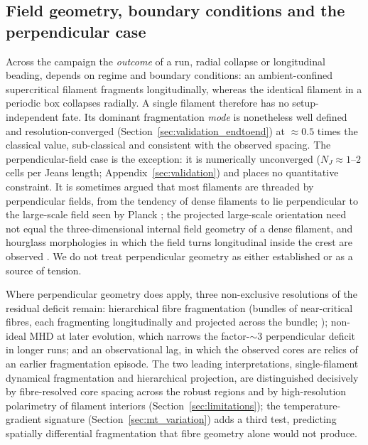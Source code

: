 \documentclass[usenatbib,twoside,twocolumn]{mnras}
\begin{document}
\subsection{Field geometry, boundary conditions and the perpendicular case}
\label{sec:why_mhd_fails}

Across the campaign the \emph{outcome} of a run, radial collapse or longitudinal beading, depends on regime and boundary conditions: an ambient-confined supercritical filament fragments longitudinally, whereas the identical filament in a periodic box collapses radially. A single filament therefore has no setup-independent fate. Its dominant fragmentation \emph{mode} is nonetheless well defined and resolution-converged (Section~\ref{sec:validation_endtoend}) at $\approx0.5$ times the classical value, sub-classical and consistent with the observed spacing. The perpendicular-field case is the exception: it is numerically unconverged ($N_J\approx1$--$2$ cells per Jeans length; Appendix~\ref{sec:validation}) and places no quantitative constraint. It is sometimes argued that most filaments are threaded by perpendicular fields, from the tendency of dense filaments to lie perpendicular to the large-scale field seen by Planck \citep{Planck2016}; the projected large-scale orientation need not equal the three-dimensional internal field geometry of a dense filament, and hourglass morphologies in which the field turns longitudinal inside the crest are observed \citep{Jadhav2026}. We do not treat perpendicular geometry as either established or as a source of tension.

Where perpendicular geometry does apply, three non-exclusive resolutions of the residual deficit remain: hierarchical fibre fragmentation (bundles of near-critical fibres, each fragmenting longitudinally and projected across the bundle; \citealt{Hacar2013,Hacar2018,Yang2024}); non-ideal MHD at later evolution, which narrows the factor-$\sim3$ perpendicular deficit in longer runs; and an observational lag, in which the observed cores are relics of an earlier fragmentation episode. The two leading interpretations, single-filament dynamical fragmentation and hierarchical projection, are distinguished decisively by fibre-resolved core spacing across the robust regions and by high-resolution polarimetry of filament interiors (Section~\ref{sec:limitations}); the temperature-gradient signature (Section~\ref{sec:mt_variation}) adds a third test, predicting spatially differential fragmentation that fibre geometry alone would not produce.
\end{document}
